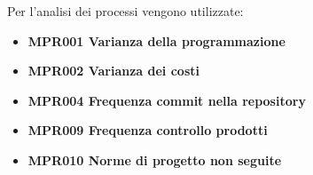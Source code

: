 				Per l'analisi dei processi vengono utilizzate:

				\begin{itemize}
					\item \textbf{MPR001 Varianza della programmazione}
					\item \textbf{MPR002 Varianza dei costi}
					\item \textbf{MPR004 Frequenza commit nella repository}
					\item \textbf{MPR009 Frequenza controllo prodotti}
					\item \textbf{MPR010 Norme di progetto non seguite}
				\end{itemize}





